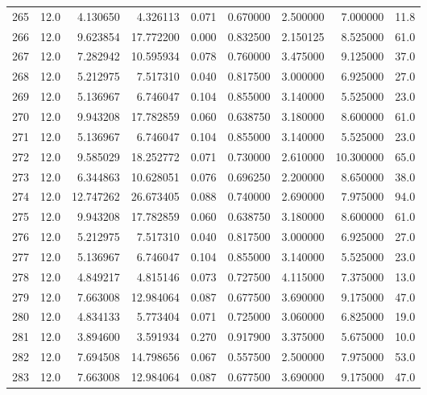 \begin{tabular}{lrrrrrrrr}
265  &   12.0 &   4.130650 &   4.326113 &  0.071 &  0.670000 &  2.500000 &   7.000000 &   11.8 \\
266  &   12.0 &   9.623854 &  17.772200 &  0.000 &  0.832500 &  2.150125 &   8.525000 &   61.0 \\
267  &   12.0 &   7.282942 &  10.595934 &  0.078 &  0.760000 &  3.475000 &   9.125000 &   37.0 \\
268  &   12.0 &   5.212975 &   7.517310 &  0.040 &  0.817500 &  3.000000 &   6.925000 &   27.0 \\
269  &   12.0 &   5.136967 &   6.746047 &  0.104 &  0.855000 &  3.140000 &   5.525000 &   23.0 \\
270  &   12.0 &   9.943208 &  17.782859 &  0.060 &  0.638750 &  3.180000 &   8.600000 &   61.0 \\
271  &   12.0 &   5.136967 &   6.746047 &  0.104 &  0.855000 &  3.140000 &   5.525000 &   23.0 \\
272  &   12.0 &   9.585029 &  18.252772 &  0.071 &  0.730000 &  2.610000 &  10.300000 &   65.0 \\
273  &   12.0 &   6.344863 &  10.628051 &  0.076 &  0.696250 &  2.200000 &   8.650000 &   38.0 \\
274  &   12.0 &  12.747262 &  26.673405 &  0.088 &  0.740000 &  2.690000 &   7.975000 &   94.0 \\
275  &   12.0 &   9.943208 &  17.782859 &  0.060 &  0.638750 &  3.180000 &   8.600000 &   61.0 \\
276  &   12.0 &   5.212975 &   7.517310 &  0.040 &  0.817500 &  3.000000 &   6.925000 &   27.0 \\
277  &   12.0 &   5.136967 &   6.746047 &  0.104 &  0.855000 &  3.140000 &   5.525000 &   23.0 \\
278  &   12.0 &   4.849217 &   4.815146 &  0.073 &  0.727500 &  4.115000 &   7.375000 &   13.0 \\
279  &   12.0 &   7.663008 &  12.984064 &  0.087 &  0.677500 &  3.690000 &   9.175000 &   47.0 \\
280  &   12.0 &   4.834133 &   5.773404 &  0.071 &  0.725000 &  3.060000 &   6.825000 &   19.0 \\
281  &   12.0 &   3.894600 &   3.591934 &  0.270 &  0.917900 &  3.375000 &   5.675000 &   10.0 \\
282  &   12.0 &   7.694508 &  14.798656 &  0.067 &  0.557500 &  2.500000 &   7.975000 &   53.0 \\
283  &   12.0 &   7.663008 &  12.984064 &  0.087 &  0.677500 &  3.690000 &   9.175000 &   47.0 \\

\end{tabular}
